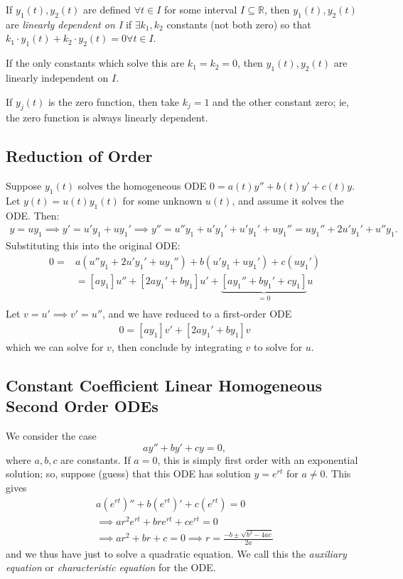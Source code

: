 \begin{definition}
    If $y_1(t), y_2(t)$ are defined $\forall t \in I$ for some interval $I \subseteq \mathbb{R}$, then $y_1(t), y_2(t)$ are \emph{linearly dependent on I} if $\exists k_1, k_2$ constants (not both zero) so that $k_1\cdot y_1(t) + k_2\cdot y_2(t) = 0 \forall t \in I$.

    If the only constants which solve this are $k_1 = k_2 = 0$, then $y_1(t), y_2(t)$ are linearly independent on $I$.
\end{definition}

\begin{remark}
    If $y_j(t)$ is the zero function, then take $k_j = 1$ and the other constant zero; ie, the zero function is always linearly dependent.
\end{remark}

\subsection{Reduction of Order}

Suppose $y_1(t)$ solves the homogeneous ODE $0 = a(t)y'' + b(t)y'+c(t)y$. Let $y(t) = u(t)y_1(t)$ for some unknown $u(t)$, and assume it solves the ODE. Then: \begin{align*}
    y = u y_1 \implies y' = u'y_1 + u y_1' \implies y'' = u''y_1 + u'y_1' + u' y_1' + uy_1'' = uy_1'' + 2u'y_1'+ u''y_1.
\end{align*}
Substituting this into the original ODE:
\begin{align*}
    0 =& a(u''y_1+2u'y_1'+uy_1'') + b(u'y_1+uy_1')+c(uy_1')\\
    &= [ay_1]u''+[2ay_1'+by_1]u'+\underbrace{[ay_1''+by_1'+cy_1]}_{=0}u\\
\end{align*}
Let $v = u' \implies v' = u''$, and we have reduced to a first-order ODE \begin{align*}
    0 = [ay_1]v' + [2ay_1'+by_1]v
\end{align*}
which we can solve for $v$, then conclude by integrating $v$ to solve for $u$.

\subsection{Constant Coefficient Linear Homogeneous Second Order ODEs}

We consider the case \[
ay''+by'+cy=0,    
\]
where $a, b, c$ are constants. If $a = 0$, this is simply first order with an exponential solution; so, suppose (guess) that this ODE has solution $y = e^{rt}$ for $a \neq 0$. This gives \begin{align*}
    a(e^{rt})'' + b(e^{rt})'+c(e^{rt}) = 0\\
    \implies ar^2e^{rt} + bre^{rt} + ce^{rt} = 0\\
    \implies ar^2+br+c= 0 \implies r= \frac{-b \pm \sqrt{b^2 - 4ac}}{2a}
\end{align*}
and we thus have just to solve a quadratic equation. We call this the \emph{auxiliary equation} or \emph{characteristic equation} for the ODE.

